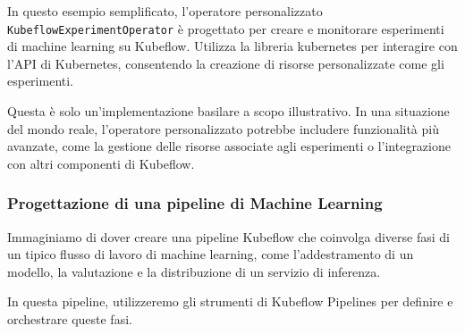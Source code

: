 In questo esempio semplificato, l'operatore personalizzato {\small \verb|KubeflowExperimentOperator|} è progettato per creare e monitorare esperimenti di machine learning su Kubeflow. Utilizza la libreria kubernetes per interagire con l'API di Kubernetes, consentendo la creazione di risorse personalizzate come gli esperimenti.

Questa è solo un'implementazione basilare a scopo illustrativo. In una situazione del mondo reale, l'operatore personalizzato potrebbe includere funzionalità più avanzate, come la gestione delle risorse associate agli esperimenti o l'integrazione con altri componenti di Kubeflow.

\subsubsection{Progettazione di una pipeline di Machine Learning}

Immaginiamo di dover creare una pipeline Kubeflow che coinvolga diverse fasi di un tipico flusso di lavoro di machine learning, come l'addestramento di un modello, la valutazione e la distribuzione di un servizio di inferenza. 

In questa pipeline, utilizzeremo gli strumenti di Kubeflow Pipelines per definire e orchestrare queste fasi.

